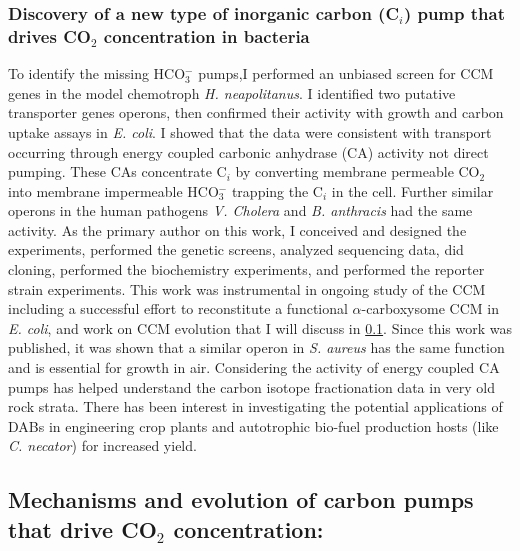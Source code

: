 \documentclass{article}
\begin{document}
\subsubsection{Discovery of a new type of inorganic carbon (C$_i$) pump that drives CO$_2$ concentration in bacteria}
To identify the missing HCO$_{3}^{-}$ pumps,I performed an unbiased screen for CCM genes in the model chemotroph \textit{H. neapolitanus}.
I identified two putative transporter genes operons, then confirmed their activity with growth and carbon uptake assays in \textit{E. coli}. 
I showed that the data were consistent with transport occurring through energy coupled carbonic anhydrase (CA) activity not direct pumping.
These CAs concentrate C$_i$ by converting membrane permeable CO$_2$ into membrane impermeable HCO$_{3}^{-}$ trapping the C$_i$ in the cell.
Further similar operons in the human pathogens \textit{V. Cholera} and \textit{B. anthracis} had the same activity.
As the primary author on this work, I conceived and designed the experiments, performed the genetic screens, analyzed sequencing data, did cloning, performed the biochemistry experiments, and performed the reporter strain experiments.
This work was instrumental in ongoing study of the CCM including a successful effort to reconstitute a functional $\alpha$-carboxysome CCM in \textit{E. coli}, and work on CCM evolution that I will discuss in \ref{CCM_EVO}. 
Since this work was published, it was shown that a similar operon in \textit{S. aureus} has the same function and is essential for growth in air. 
Considering the activity of energy coupled CA pumps has helped understand the carbon isotope fractionation data in very old rock strata.
There has been interest in investigating the potential applications of DABs in engineering crop plants and autotrophic bio-fuel production hosts (like \textit{C. necator}) for increased yield.
%
\nocite{Desmarais2019-yc,Desmarais2018-ac,Desmarais2019-dc}
\printbibliography[heading=none]

\leavevmode\pagebreak

\newrefsection
\subsection{Mechanisms and evolution of carbon pumps that drive CO$_2$ concentration:}\label{CCM_EVO}
\end{document}
